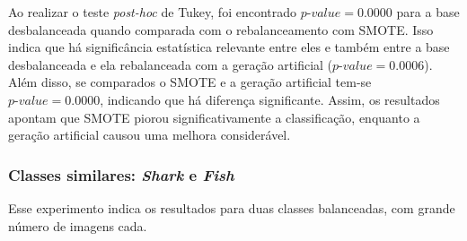

Ao realizar o teste \textit{post-hoc} de Tukey, foi encontrado $\textit{p-value} = 0.0000$ para a base desbalanceada quando comparada com o rebalanceamento com SMOTE. Isso indica que há significância estatística relevante entre eles e também entre a base desbalanceada e ela rebalanceada com a geração artificial ($\textit{p-value} = 0.0006$). Além disso, se comparados o SMOTE e a geração artificial tem-se $\textit{p-value} = 0.0000$, indicando que há diferença significante. Assim, os resultados apontam que SMOTE piorou significativamente a classificação, enquanto a geração artificial causou uma melhora considerável.


\subsubsection{Classes similares: \textit{Shark} e \textit{Fish}}
Esse experimento indica os resultados para duas classes balanceadas, com grande número de imagens cada.


